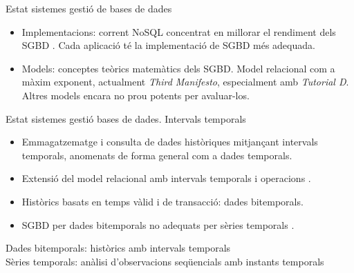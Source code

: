 \begin{frame}{Estat sistemes gestió de bases de dades}

  \begin{itemize}  

    
  \item Implementacions: corrent NoSQL concentrat en millorar el
    rendiment dels SGBD \parencite{stonebraker10}. Cada aplicació té
    la implementació de SGBD més adequada.


  \item Models: conceptes teòrics matemàtics dels SGBD. Model
    relacional com a màxim exponent, actualment \emph{Third
      Manifesto}, especialment amb \emph{Tutorial D}. Altres models
    encara no prou potents per avaluar-los.


  \end{itemize}
  
\end{frame}



\begin{frame}{Estat sistemes gestió bases de dades. Intervals temporals}

  \begin{itemize}  

  \item Emmagatzematge i consulta de dades històriques mitjançant
    intervals temporals, anomenats de forma general com a dades
    temporals.

  \item Extensió del model relacional amb intervals temporals i
    operacions \parencite{date02:_tempor_data_relat_model}.

  \item Històrics basats en temps vàlid i de transacció: dades
    bitemporals.

  \item SGBD per dades bitemporals no adequats per sèries
    temporals \parencite{schmidt95}.
  \end{itemize}
    

  Dades bitemporals: històrics amb intervals temporals\\
  Sèries temporals: anàlisi d'observacions seqüencials amb instants
  temporals

\end{frame}



